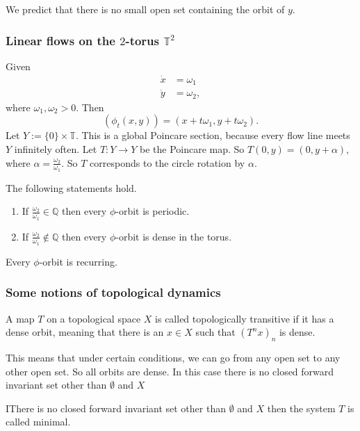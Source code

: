 \documentclass{article}
\newcommand*{\Q}{\mathbb{Q}}
\newcommand*{\T}{\mathbb{T}}
\begin{document}
\begin{rem}
    We predict that there is no small open set containing the orbit of $y$.
\end{rem}

\subsubsection{Linear flows on the $2$-torus $\T^2$}
Given
$$\begin{aligned}
    \dot x&=\omega_1\\
    \dot y&=\omega_2,
\end{aligned}$$
where $\omega_1,\omega_2 > 0$. Then
$$(\phi_t(x,y))=(x+t\omega_1,y+t\omega_2).$$
Let $Y:= \{0\}\times \T$. This is a global Poincare section, because every flow line meets $Y$ infinitely often. Let $T:Y\to Y$ be the Poincare map. So $T(0,y) = (0,y+\alpha)$, where $\alpha=\frac{\omega_2}{\omega_1}$. So $T$ corresponds to the circle rotation by $\alpha$.

\begin{prop}
    The following statements hold.
    \begin{enumerate}
        \item If $\frac{\omega_2}{\omega_1} \in \Q$ then every $\phi$-orbit is periodic.

        \item If $\frac{\omega_2}{\omega_1} \notin \Q$ then every $\phi$-orbit is dense in the torus.
    \end{enumerate}
\end{prop}

\begin{cor}
    Every $\phi$-orbit is recurring.
\end{cor}

\subsubsection{Some notions of topological dynamics}

\begin{defin}
    A map $T$ on a topological space $X$ is called topologically transitive if it has a dense orbit, meaning that there is an $x\in X$ such that $(T^nx)_n$ is dense.
\end{defin}
This means that under certain conditions, we can go from any open set to any other open set. So all orbits are dense. In this case there is no closed forward invariant set other than $\emptyset$ and $X$

\begin{defin}
    IThere is no closed forward invariant set other than $\emptyset$ and $X$ then the system $T$ is called minimal.
\end{defin}
\end{document}
